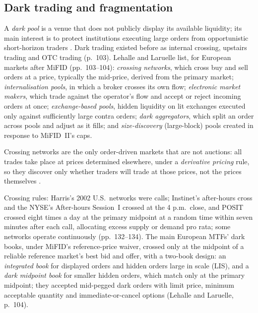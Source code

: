 \subsection{Dark trading and fragmentation}

\begin{qfdefinition}\label{def:dark-pools-crossing}
 A \emph{dark pool} is a venue that does not publicly display its available liquidity; its main interest is to protect institutions executing large orders from opportunistic short-horizon traders \citep[chap.~1, sec.~1.4, p.~102]{alpha-laruelle}. Dark trading existed before as internal crossing, upstairs trading and OTC trading (p.~103). Lehalle and Laruelle list, for European markets after MiFID (pp.~103--104): \emph{crossing networks}, which cross buy and sell orders at a price, typically the mid-price, derived from the primary market; \emph{internalisation pools}, in which a broker crosses its own flow; \emph{electronic market makers}, which trade against the operator's flow and accept or reject incoming orders at once; \emph{exchange-based pools}, hidden liquidity on lit exchanges executed only against sufficiently large contra orders; \emph{dark aggregators}, which split an order across pools and adjust as it fills; and \emph{size-discovery} (large-block) pools created in response to MiFID~II's caps.

Crossing networks are the only order-driven markets that are not auctions: all trades take place at prices determined elsewhere, under a \emph{derivative pricing} rule, so they discover only whether traders will trade at those prices, not the prices themselves \citep[chap.~6, sec.~6.5, p.~132]{alpha-harris}.

 Crossing rules: Harris's 2002 U.S.\ networks were calls; Instinet's after-hours cross and the NYSE's After-hours Session~I crossed at the 4 p.m.\ close, and POSIT crossed eight times a day at the primary midpoint at a random time within seven minutes after each call, allocating excess supply or demand pro rata; some networks operate continuously (pp.~132--134). The main European MTFs' dark books, under MiFID's reference-price waiver, crossed only at the midpoint of a reliable reference market's best bid and offer, with a two-book design: an \emph{integrated book} for displayed orders and hidden orders large in scale (LIS), and a \emph{dark midpoint book} for smaller hidden orders, which match only at the primary midpoint; they accepted mid-pegged dark orders with limit price, minimum acceptable quantity and immediate-or-cancel options (Lehalle and Laruelle, p.~104).


\end{qfdefinition}
